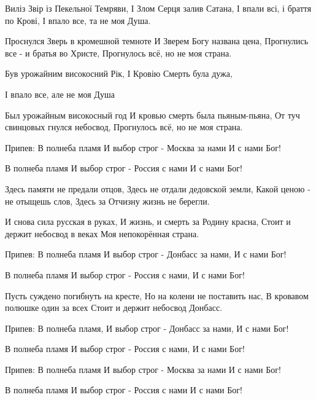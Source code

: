  
 
 
 
 

Виліз Звір із Пекельної Темряви,
І Злом Серця залив Сатана,
І впали всі, і браття по Крові,
І впало все, та не моя Душа.

Проснулся Зверь в кромешной темноте
И Зверем Богу названа цена,
Прогнулись все - и братья во Христе,
Прогнулось всё, но не моя страна.

Був урожайним високосний Рік,
І Кровію Смерть була дужа,

І впало все, але не моя Душа
 
Был урожайным високосный год
И кровью смерть была пьяным-пьяна,
От туч свинцовых гнулся небосвод,
Прогнулось всё, но не моя страна.
 
Припев:
В полнеба пламя
И выбор строг -
Москва за нами
И с нами Бог!
 
В полнеба пламя
И выбор строг -
Россия с нами
И с нами Бог!
 
Здесь памяти не предали отцов,
Здесь не отдали дедовской земли,
Какой ценою - не отыщешь слов,
Здесь за Отчизну жизнь не берегли.
 
И снова сила русская в руках,
И жизнь, и смерть за Родину красна,
Стоит и держит небосвод в веках
Моя непокорённая страна.
 
Припев:
В полнеба пламя
И выбор строг -
Донбасс за нами,
И с нами Бог!
 
В полнеба пламя
И выбор строг -
Россия с нами,
И с нами Бог!
 
Пусть суждено погибнуть на кресте,
Но на колени не поставить нас,
В кровавом полюшке один за всех
Стоит и держит небосвод Донбасс.
 
Припев:
В полнеба пламя,
И выбор строг -
Донбасс за нами,
И с нами Бог!
 
В полнеба пламя
И выбор строг -
Россия с нами,
И с нами Бог!
 
Припев:
В полнеба пламя
И выбор строг -
Москва за нами
И с нами Бог!
 
В полнеба пламя
И выбор строг -
Россия с нами
И с нами Бог!  

